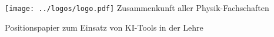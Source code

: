 \documentclass[DIV=calc]{scrartcl}
\begin{document}
\hspace{0.87\textwidth}
\begin{minipage}{120pt}
	\vspace{-1.8cm}
	\texttt{[image: ../logos/logo.pdf]}
	\centering
	\small Zusammenkunft aller Physik-Fachschaften
\end{minipage}

\begin{center}
  \huge{Positionspapier zum Einsatz von KI-Tools in der Lehre}\vspace{.25\baselineskip}\\
  \normalsize
\end{center}
\vspace{1cm}






\end{document}
